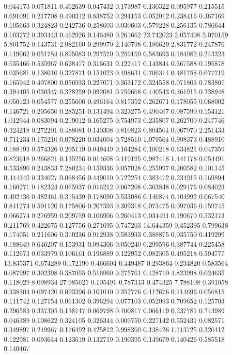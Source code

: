 0.044173
0.071811
0.462639
0.047432
0.173987
0.130322
0.095977
0.215515
0.691091
0.217708
0.490312
0.838752
0.294153
0.052012
0.238416
0.367169
0.105663
0.324823
0.242736
0.258603
0.030603
0.579228
0.256135
0.786644
0.103272
0.393443
0.462926
0.146480
0.261662
23.742023
2.057408
5.070159
5.801752
0.143731
2.982160
0.299970
2.140798
0.186629
2.831772
0.247876
0.119062
0.051784
0.895083
0.297570
0.259159
0.583693
0.184082
0.243323
0.535466
0.535967
0.628477
0.316631
0.122417
0.143844
0.367588
0.195878
0.035681
0.138010
0.327871
0.151023
0.498631
0.706314
0.481758
0.077719
0.165942
0.407800
0.056933
0.227071
0.363172
0.324558
0.071803
0.783807
0.394405
0.030347
0.328259
0.092081
0.759668
0.440543
0.361915
0.238948
0.050123
0.054577
0.255606
0.496164
0.817352
0.262671
0.178055
0.068002
0.146721
0.205650
0.285251
0.131494
0.323275
0.490467
0.087590
0.154121
1.012944
0.083094
0.219012
0.165275
0.754973
0.235807
0.262700
0.247746
0.324218
0.272201
0.488081
0.140308
0.810823
0.804504
0.067970
2.251433
0.711234
0.175210
0.078220
0.034004
0.728510
1.079564
0.998373
0.488910
0.188193
0.574326
0.205119
0.049449
0.164284
0.100218
0.634821
0.047359
0.823618
0.266821
0.135256
0.014608
0.119195
0.982418
1.441178
0.054491
0.533896
0.243833
7.280234
0.159336
0.057028
0.255997
0.200582
0.101145
0.444349
0.334027
0.068456
0.449010
0.722254
0.383472
0.234915
0.169894
0.160271
0.182324
0.065937
0.016212
0.067208
0.303848
0.029176
0.084023
0.402136
0.482461
0.315439
0.178090
0.533086
0.146874
0.104992
0.067540
0.841274
0.501120
0.175806
0.207593
0.309318
0.073475
0.097036
0.159745
0.066274
0.276959
0.209759
0.106906
0.260413
0.034491
0.190670
0.532173
0.211769
0.422675
0.127756
0.271695
0.747203
14.644359
0.452395
0.799638
0.174051
0.211606
0.310236
0.912938
0.583933
0.388875
0.035750
0.419299
0.188649
0.646207
0.153931
0.094306
0.050240
0.299596
0.387744
0.225458
0.112673
0.033979
0.106161
0.196889
0.122952
0.082305
0.495218
0.594777
13.835371
0.674289
0.172190
0.466604
0.449487
0.293864
0.234820
0.583564
0.087997
0.302398
0.387055
0.516960
0.275761
0.428710
4.823998
0.024635
0.118029
8.008934
27.985625
0.105491
0.787313
0.474325
7.788108
0.391058
0.338304
0.097420
0.093396
0.101040
0.352776
0.112676
0.114696
0.056815
0.111742
0.127154
0.061302
0.396294
0.077103
0.052093
0.709652
0.125703
0.296583
0.337305
0.138747
0.069798
0.400817
0.066119
0.237781
0.243989
0.046389
0.108622
0.324105
0.326344
0.009750
0.227142
0.552431
0.082571
0.349897
0.249967
0.176492
0.425812
0.998360
0.138426
1.113725
0.320412
0.122981
0.093644
0.123619
0.132719
0.190395
0.149679
0.140426
0.585518
0.140467
